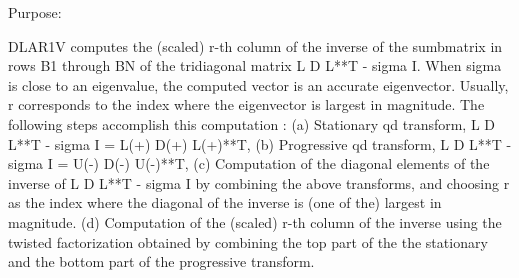  \begin{DoxyParagraph}{Purpose\+: }
\begin{DoxyVerb} DLAR1V computes the (scaled) r-th column of the inverse of
 the sumbmatrix in rows B1 through BN of the tridiagonal matrix
 L D L**T - sigma I. When sigma is close to an eigenvalue, the
 computed vector is an accurate eigenvector. Usually, r corresponds
 to the index where the eigenvector is largest in magnitude.
 The following steps accomplish this computation :
 (a) Stationary qd transform,  L D L**T - sigma I = L(+) D(+) L(+)**T,
 (b) Progressive qd transform, L D L**T - sigma I = U(-) D(-) U(-)**T,
 (c) Computation of the diagonal elements of the inverse of
     L D L**T - sigma I by combining the above transforms, and choosing
     r as the index where the diagonal of the inverse is (one of the)
     largest in magnitude.
 (d) Computation of the (scaled) r-th column of the inverse using the
     twisted factorization obtained by combining the top part of the
     the stationary and the bottom part of the progressive transform.\end{DoxyVerb}
 
\end{DoxyParagraph}

